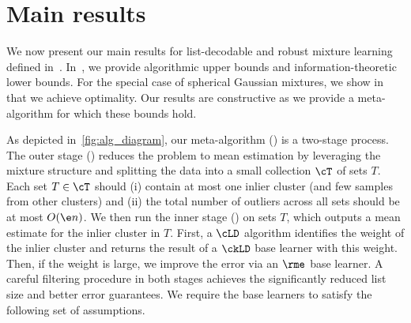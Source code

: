\section{Main results}
\label{sec:main_results}

We now present our main results for list-decodable and robust mixture learning defined in~. %
In~, we provide algorithmic upper bounds and information-theoretic lower bounds. For the special case of spherical Gaussian mixtures, we show in~ that we achieve optimality. 
Our results are constructive as we provide a meta-algorithm for which these bounds hold. 

As depicted in~\cref{fig:alg_diagram}, our meta-algorithm () is a two-stage process. The outer stage () reduces the problem to mean estimation by leveraging the mixture structure and splitting the data into a small collection $\cT$ of sets $T$.
Each set $T \in \cT$ should (i) contain at most one inlier cluster (and few samples from other clusters) and (ii) the total number of outliers across all sets should be at most \(O(\e n)\).
We then run the inner stage () on sets \(T\), which outputs a mean estimate for the inlier cluster in $T$. First, a \(\cLD\) algorithm identifies the weight of the inlier cluster and returns the result of a \(\ckLD\) base learner with this weight. Then, if the weight is large, we improve the error via an \(\rme\) base learner. 
A careful filtering procedure in both stages achieves the significantly reduced list size and better error guarantees. 
We require the base learners to satisfy the following set of assumptions.


